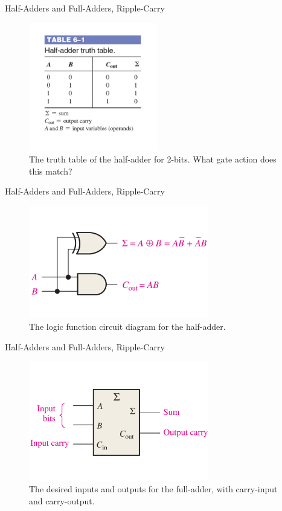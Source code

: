\documentclass{beamer}
\begin{document}
\begin{frame}{Half-Adders and Full-Adders, Ripple-Carry}
\begin{figure}
\centering
\includegraphics[width=0.5\textwidth]{figures/adder2.pdf}
\caption{\label{fig:add2} The truth table of the half-adder for 2-bits.  What gate action does this match?}
\end{figure}
\end{frame}

\begin{frame}{Half-Adders and Full-Adders, Ripple-Carry}
\begin{figure}
\centering
\includegraphics[width=0.7\textwidth]{figures/adder3.pdf}
\caption{\label{fig:add3} The logic function circuit diagram for the half-adder.}
\end{figure}
\end{frame}

\begin{frame}{Half-Adders and Full-Adders, Ripple-Carry}
\begin{figure}
\centering
\includegraphics[width=0.7\textwidth]{figures/adder4.pdf}
\caption{\label{fig:add4} The desired inputs and outputs for the full-adder, with carry-input and carry-output.}
\end{figure}
\end{frame}
\end{document}
